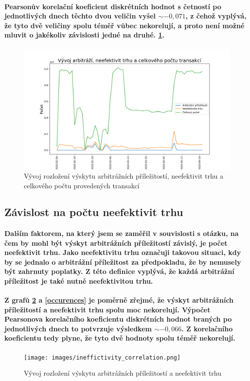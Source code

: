 \documentclass[thesis=B,czech]{FITthesis}[2019/03/21]
\begin{document}
\paragraph{
Pearsonův korelační koeficient diskrétních hodnot s četností po jednotlivých dnech těchto dvou veličin vyšel \(\sim-0,071\), z čehož vyplývá, že tyto dvě veličiny spolu téměř vůbec nekorelují, a proto není možné mluvit o jakékoliv závislosti jedné na druhé. \ref{occurence_correlation}.
}
\begin{figure}\centering
	\includegraphics[width=1\textwidth]{images/occurence_correlation.png}
	\caption{Vývoj rozložení výskytu arbitrážních příležitostí, neefektivit trhu a celkového počtu provedených transakcí}\label{occurence_correlation}
\end{figure}
\subsection{Závislost na počtu neefektivit trhu}
\paragraph{
Dalším faktorem, na který jsem se zaměřil v souvislosti s otázku, na čem by mohl být výskyt arbitrážních příležitostí závislý, je počet neefektivit trhu. Jako neefektivitu trhu označuji takovou situaci, kdy by se jednalo o arbitrážní příležitost za předpokladu, že by nemusely být zahrnuty poplatky. Z této definice vyplývá, že každá arbitrážní příležitost je také nutně neefektivitou trhu.
}
\paragraph{
Z grafů \ref{ineffictivity_correlation} a \ref{occurences} je poměrně zřejmé, že výskyt arbitrážních příležitostí a neefektivit trhu spolu moc nekorelují. Výpočet Pearsonova korelačního koeficientu diskrétních hodnot braných po jednotlivých dnech to potvrzuje výsledkem \(\sim-0,066\). Z korelačního koeficientu tedy plyne, že tyto dvě hodnoty spolu téměř nekorelují.
}
\begin{figure}\centering
	\texttt{[image: images/ineffictivity\_correlation.png]}
	\caption{Vývoj rozložení výskytu arbitrážních příležitostí a neefektivit trhu}\label{ineffictivity_correlation}
\end{figure}
\end{document}
